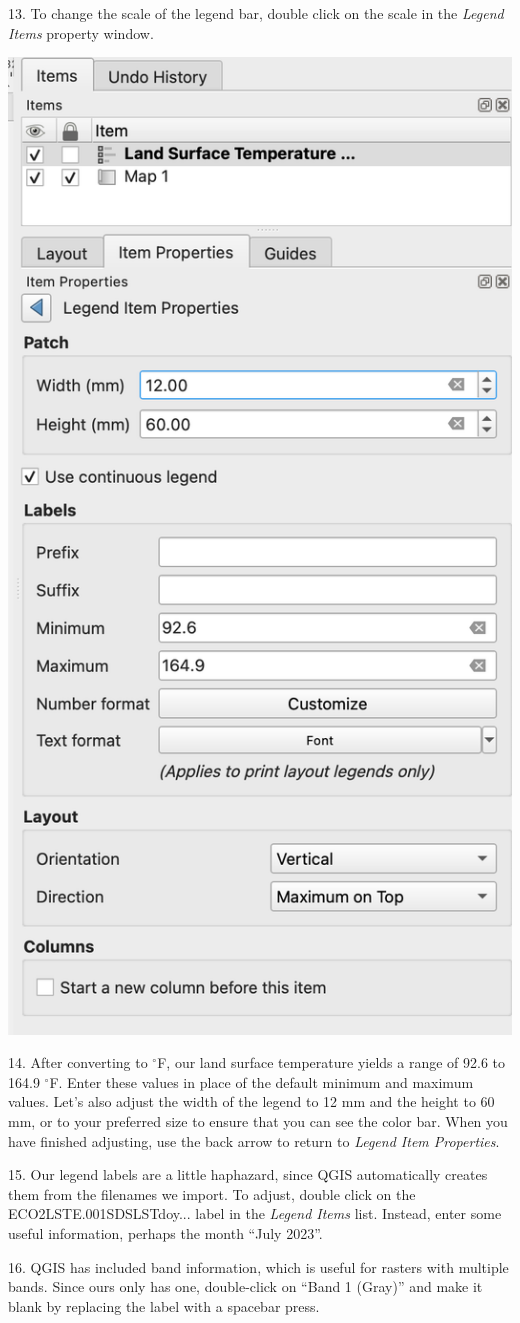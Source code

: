 \documentclass[oneside,a4paper,11pt,explicit]{book}
\begin{document}
13. To change the scale of the legend bar, double click on the scale in the \textit{Legend Items} property window.

\vspace{.25em}

\centerline{\includegraphics[width=.5\textwidth]{tempscale.png}}

14. After converting to $^{\circ}$F, our land surface temperature yields a range of 92.6 to 164.9 $^{\circ}$F. Enter these values in place of the default minimum and maximum values. Let's also adjust the width of the legend to 12 mm and the height to 60 mm, or to your preferred size to ensure that you can see the color bar. When you have finished adjusting, use the back arrow to return to \textit{Legend Item Properties}.

15. Our legend labels are a little haphazard, since QGIS automatically creates them from the filenames we import. To adjust, double click on the ECO2LSTE.001SDSLSTdoy... label in the \textit{Legend Items} list. Instead, enter some useful information, perhaps the month ``July 2023''. 

16. QGIS has included band information, which is useful for rasters with multiple bands. Since ours only has one, double-click on ``Band 1 (Gray)'' and make it blank by replacing the label with a spacebar press.
\end{document}
